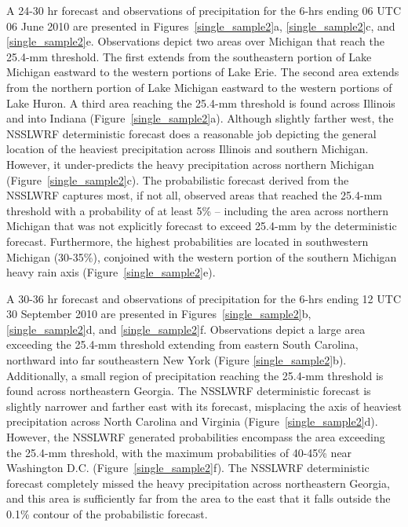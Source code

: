 A 24-30 hr forecast and observations of precipitation for the 6-hrs ending 06 UTC 06 June 2010 are presented in \mbox{Figures \ref{single_sample2}a}, \mbox{\ref{single_sample2}c}, and \mbox{\ref{single_sample2}e}. Observations depict two areas over Michigan that reach the 25.4-mm threshold. The first extends from the southeastern portion of Lake Michigan eastward to the western portions of Lake Erie. The second area extends from the northern portion of Lake Michigan eastward to the western portions of Lake Huron. A third area reaching the 25.4-mm threshold is found across Illinois and into Indiana \mbox{(Figure \ref{single_sample2}a)}. Although slightly farther west, the NSSLWRF deterministic forecast does a reasonable job depicting the general location of the heaviest precipitation across Illinois and southern Michigan. However, it under-predicts the heavy precipitation across northern Michigan \mbox{(Figure \ref{single_sample2}c)}. The probabilistic forecast derived from the NSSLWRF captures most, if not all, observed areas that reached the 25.4-mm threshold with a probability of at least 5\% -- including the area across northern Michigan that was not explicitly forecast to exceed 25.4-mm by the deterministic forecast. Furthermore, the highest probabilities are located in southwestern Michigan (30-35\%), conjoined with the western portion of the southern Michigan heavy rain axis \mbox{(Figure \ref{single_sample2}e)}.

A 30-36 hr forecast and observations of precipitation for the 6-hrs ending 12 UTC 30 September 2010 are presented in \mbox{Figures \ref{single_sample2}b}, \mbox{\ref{single_sample2}d}, and \mbox{\ref{single_sample2}f}. Observations depict a large area exceeding the 25.4-mm threshold extending from eastern South Carolina, northward into far southeastern New York (Figure \mbox{\ref{single_sample2}b)}. Additionally, a small region of precipitation reaching the 25.4-mm threshold is found across northeastern Georgia. The NSSLWRF deterministic forecast is slightly narrower and farther east with its forecast, misplacing the axis of heaviest precipitation across North Carolina and Virginia \mbox{(Figure \ref{single_sample2}d)}. However, the NSSLWRF generated probabilities encompass the area exceeding the 25.4-mm threshold, with the maximum probabilities of 40-45\% near Washington D.C. \mbox{(Figure \ref{single_sample2}f)}. The NSSLWRF deterministic forecast completely missed the heavy precipitation across northeastern Georgia, and this area is sufficiently far from the area to the east that it falls outside the 0.1\% contour of the probabilistic forecast.

